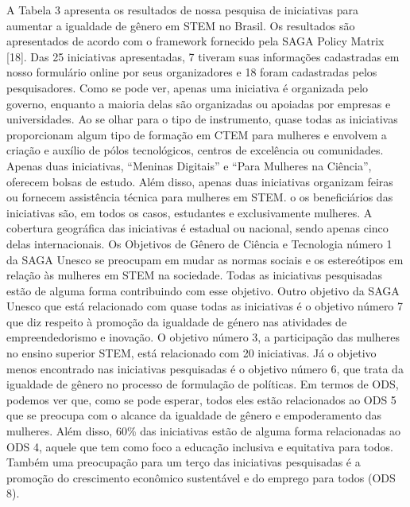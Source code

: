 A Tabela 3 apresenta os resultados de nossa pesquisa de iniciativas para aumentar a igualdade de gênero em STEM no Brasil. Os resultados são apresentados de acordo com o framework fornecido pela SAGA Policy Matrix [18]. Das 25 iniciativas apresentadas, 7 tiveram suas informações cadastradas em nosso formulário online por seus organizadores e 18 foram cadastradas pelos pesquisadores. Como se pode ver, apenas uma iniciativa é organizada pelo governo, enquanto a maioria delas são organizadas ou apoiadas por empresas e universidades. Ao se olhar para o tipo de instrumento, quase todas as iniciativas proporcionam algum tipo de formação em CTEM para mulheres e envolvem a criação e auxílio de pólos tecnológicos, centros de excelência ou comunidades. Apenas duas iniciativas, “Meninas Digitais” e “Para Mulheres na Ciência”, oferecem bolsas de estudo. Além disso, apenas duas iniciativas organizam feiras ou fornecem assistência técnica para mulheres em STEM. o
os beneficiários das iniciativas são, em todos os casos, estudantes e exclusivamente mulheres. A cobertura geográfica das iniciativas é estadual ou nacional, sendo apenas cinco delas internacionais. Os Objetivos de Gênero de Ciência e Tecnologia número 1 da SAGA Unesco se preocupam em mudar as normas sociais e os estereótipos em relação às mulheres em STEM na sociedade. Todas as iniciativas pesquisadas
estão de alguma forma contribuindo com esse objetivo. Outro objetivo da SAGA Unesco que está relacionado com quase todas as iniciativas é o objetivo número 7 que diz respeito à promoção da igualdade de género nas atividades de empreendedorismo e inovação. O objetivo número 3, a participação das mulheres no ensino superior STEM, está relacionado com 20 iniciativas. Já o objetivo menos encontrado nas iniciativas pesquisadas é o objetivo número 6, que trata da igualdade de gênero no processo de formulação de políticas. Em termos de ODS, podemos ver que, como se pode esperar, todos eles estão relacionados ao ODS 5 que se preocupa com o alcance da igualdade de gênero e empoderamento das mulheres. Além disso, 60\% das iniciativas estão de alguma forma relacionadas ao ODS 4, aquele que tem como foco a educação inclusiva e equitativa para todos. Também uma preocupação para um terço das iniciativas pesquisadas é a promoção do crescimento econômico sustentável e do emprego para todos (ODS 8).

